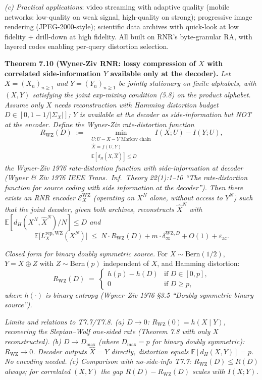 \documentclass[
]{article}
\begin{document}
\emph{(c) Practical applications}: video streaming with adaptive
quality (mobile networks: low-quality on weak signal, high-quality
on strong); progressive image rendering (JPEG-2000-style); scientific
data archives with quick-look at low fidelity + drill-down at high
fidelity. All built on RNR's byte-granular RA, with layered codes
enabling per-query distortion selection.

\textbf{Theorem 7.10 (Wyner-Ziv RNR: lossy compression of $X$ with
correlated side-information $Y$ available only at the decoder).}
\emph{Let $X = (X_n)_{n \geq 1}$ and $Y = (Y_n)_{n \geq 1}$ be jointly
stationary on finite alphabets, with $(X, Y)$ satisfying the joint
exp-mixing condition (5.8) on the product alphabet. Assume only $X$
needs reconstruction with Hamming distortion budget
$D \in [0, 1 - 1/|\Sigma_X|]$; $Y$ is available at the decoder as
side-information but NOT at the encoder. Define the Wyner-Ziv
rate-distortion function}
\[
R_{\mathrm{WZ}}(D) \;:=\; \min_{\substack{U : U - X - Y \text{ Markov chain} \\ \hat{X} = f(U, Y) \\ \mathbb{E}[d_H(X, \hat{X})] \leq D}} I(X; U) - I(Y; U),
\]
\emph{the Wyner-Ziv 1976 rate-distortion function with side-information
at decoder (Wyner \& Ziv 1976 \emph{IEEE Trans.\ Inf.\ Theory}
22(1):1--10 ``The rate-distortion function for source coding with
side information at the decoder''). Then there exists an RNR encoder
$\mathcal{E}_X^{\mathrm{WZ}}$ (operating on $X^N$ alone, without
access to $Y^N$) such that the joint decoder, given both archives,
reconstructs $\hat{X}^N$ with $\mathbb{E}[d_H(X^N, \hat{X}^N)/N]
\leq D$ and}
\[
\mathbb{E}\bigl[L^{\mathrm{rep},\mathrm{WZ}}_X(X^N)\bigr]
\;\leq\;
N \cdot R_{\mathrm{WZ}}(D) + m \cdot \delta_\infty^{\mathrm{WZ}, D} + O(1) + \varepsilon_{\mathrm{ac}}.
\]

\emph{Closed form for binary doubly symmetric source.} For
$X \sim \mathrm{Bern}(1/2)$, $Y = X \oplus Z$ with $Z \sim \mathrm{Bern}(p)$
independent of $X$, and Hamming distortion:
\[
R_{\mathrm{WZ}}(D) \;=\; \begin{cases} h(p) - h(D) & \text{if } D \in [0, p], \\ 0 & \text{if } D \geq p, \end{cases}
\]
\emph{where $h(\cdot)$ is binary entropy (Wyner--Ziv 1976 §3.5
``Doubly symmetric binary source'').}

\emph{Limits and relations to T7.7/T7.8.}
\emph{(a) $D \to 0$: $R_{\mathrm{WZ}}(0) = h(X \mid Y)$, recovering
the Slepian--Wolf one-sided rate (Theorem 7.8 with only $X$
reconstructed).}
\emph{(b) $D \to D_{\max}$ (where $D_{\max} = p$ for binary doubly
symmetric): $R_{\mathrm{WZ}} \to 0$. Decoder outputs $\hat{X} = Y$
directly, distortion equals $\mathbb{E}[d_H(X, Y)] = p$. No encoding
needed.}
\emph{(c) Comparison with no-side-info T7.7: $R_{\mathrm{WZ}}(D) \leq
R(D)$ always; for correlated $(X, Y)$ the gap $R(D) - R_{\mathrm{WZ}}(D)$
scales with $I(X; Y)$.}
\end{document}
